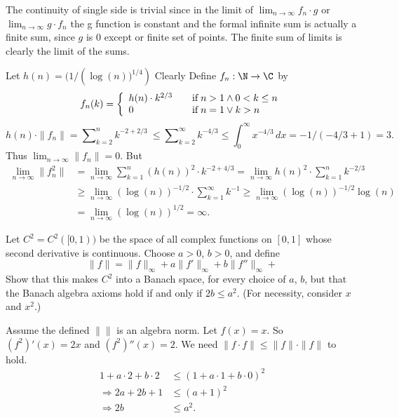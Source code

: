 \begin{enumerate}
The continuity of single side is trivial
since in the limit of
\(\lim_{n\to\infty} f_n\cdot g\)
or
\(\lim_{n\to\infty} g\cdot f_n\)
the g function is constant
and the formal infinite sum is actually a finite sum,
since $g$ is $0$ except or finite set of points.
The finite sum of limits is clearly the limit of the sums.

Let \(h(n) = (1/\left(\log(n))^{1/4}\right)\)
Clearly
Define \(f_n : \N \to \C\) by
\begin{equation*}
f_n(k) = \left\{
\begin{array}{ll}
h(n)\cdot k^{2/3} & \quad \textnormal{if}\; n > 1 \land 0 < k \leq n \\
0 & \quad \textnormal{if}\; n = 1 \lor k > n 
\end{array}\right.
\end{equation*}
\begin{equation*}
h(n)\cdot\|f_n\|
  = \sum\nolimits_{k=2}^n k^{-2+2/3}\
  \leq \sum\nolimits_{k=2}^\infty k^{-4/3}
  \leq \int\nolimits_0^\infty x^{-4/3}\,dx
  = -1/(-4/3 + 1) = 3.
\end{equation*}
Thus \(\lim_{n\to\infty} \|f_n\| = 0\).
But
\begin{align*}
\lim_{n\to\infty} \|f_n^2\|
 &= \lim_{n\to\infty} \sum\nolimits_{k=1}^n (h(n))^2\cdot k^{-2+4/3}
   = \lim_{n\to\infty} h(n)^2\cdot \sum\nolimits_{k=1}^n k^{-2/3} \\
 & \geq \lim_{n\to\infty} \left(\log(n)\right)^{-1/2}
     \cdot  \sum\nolimits_{k=1}^\infty k^{-1}
   \geq \lim_{n\to\infty} \left(\log(n)\right)^{-1/2} \log(n) \\
 &= \lim_{n\to\infty} \left(\log(n)\right)^{1/2} = \infty.
\end{align*}

\begin{excopy}
Let \(C^2 = C^2([0, 1))\) be the space of all complex functions
  on \([0, 1]\) whose
second derivative is continuous. Choose \(a > 0\), \(b > 0\), and define
\begin{equation*}
\|f\| = \|f\|_\infty + a\|f'\|_\infty +  b\|f''\|_\infty +
\end{equation*}
Show that this makes \(C^2\) into a Banach space,
  for every choice of $a$, $b$, but that
the Banach algebra axioms hold
 if and only if \(2b \leq a^2\).
 (For necessity, consider $x$ and \(x^2\).)
\end{excopy}

Assume the defined \(\|\|\) is an algebra norm.
Let \(f(x)=x\). So \((f^2)'(x) = 2x\) and
\hbox{\((f^2)''(x) = 2\)}.
We need \(\|f\cdot f\| \leq \|f\|\cdot\|f\|\) to hold.
\begin{align*}
1 + a\cdot 2 + b\cdot 2 &\leq (1 + a\cdot 1 + b\cdot 0)^2 \\
\Rightarrow 2a + 2b + 1 &\leq (a + 1)^2 \\
\Rightarrow 2b &\leq a^2.
\end{align*}


\end{enumerate}
